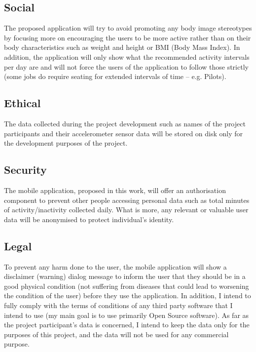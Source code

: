     \subsection{Social}
    The proposed application will try to avoid promoting any body image stereotypes by focusing more on encouraging the users to be more active rather than on their body characteristics such as weight and height or BMI (Body Mass Index). In addition, the application will only show what the recommended activity intervals per day are and will not force the users of the application to follow those strictly (some jobs do require seating for extended intervals of time – e.g. Pilots).
    
    \subsection{Ethical}
    The data collected during the project development such as names of the project participants and their accelerometer sensor data will be stored on disk only for the development purposes of the project. 
    
    \subsection{Security}
    The mobile application, proposed in this work, will offer an authorisation component to prevent other people accessing personal data such as total minutes of activity/inactivity collected daily. What is more, any relevant or valuable user data will be anonymised to protect individual’s identity.

    
    \subsection{Legal}
    To prevent any harm done to the user, the mobile application will show a disclaimer (warning) dialog message to inform the user that they should be in a good physical condition (not suffering from diseases that could lead to worsening the condition of the user) before they use the application. In addition, I intend to fully comply with the terms of conditions of any third party software that I intend to use (my main goal is to use primarily Open Source software). As far as the project participant’s data is concerned, I intend to keep the data only for the purposes of this project, and the data will not be used for any commercial purpose. 
